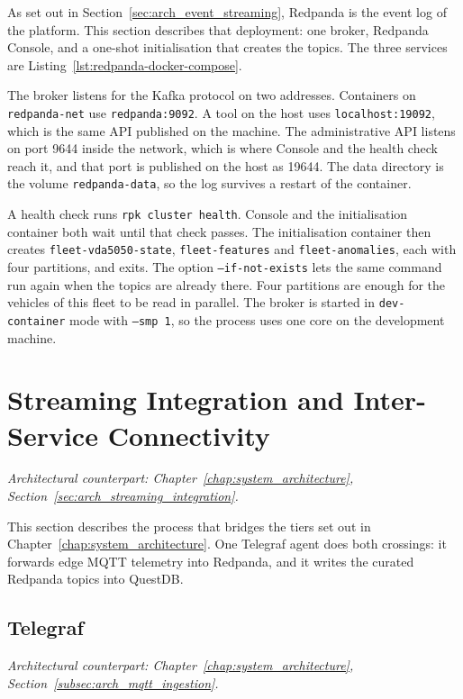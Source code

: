 As set out in Section~\ref{sec:arch_event_streaming}, Redpanda is the event log of the platform. This section describes that deployment: one broker, Redpanda Console, and a one-shot initialisation that creates the topics. The three services are Listing~\ref{lst:redpanda-docker-compose}.

The broker listens for the Kafka protocol on two addresses. Containers on \texttt{redpanda-net} use \texttt{redpanda:9092}. A tool on the host uses \texttt{localhost:19092}, which is the same API published on the machine. The administrative API listens on port 9644 inside the network, which is where Console and the health check reach it, and that port is published on the host as 19644. The data directory is the volume \texttt{redpanda-data}, so the log survives a restart of the container.

A health check runs \texttt{rpk cluster health}. Console and the initialisation container both wait until that check passes. The initialisation container then creates \texttt{fleet-vda5050-state}, \texttt{fleet-features} and \texttt{fleet-anomalies}, each with four partitions, and exits. The option \texttt{--if-not-exists} lets the same command run again when the topics are already there. Four partitions are enough for the vehicles of this fleet to be read in parallel. The broker is started in \texttt{dev-container} mode with \texttt{--smp 1}, so the process uses one core on the development machine.


\section{Streaming Integration and Inter-Service Connectivity}
\label{sec:stream_integration_implementation}
\textit{Architectural counterpart: Chapter~\ref{chap:system_architecture}, Section~\ref{sec:arch_streaming_integration}.}

This section describes the process that bridges the tiers set out in Chapter~\ref{chap:system_architecture}. One Telegraf agent does both crossings: it forwards edge MQTT telemetry into Redpanda, and it writes the curated Redpanda topics into QuestDB.

\subsection{Telegraf}
\label{subsec:telegraf_integration}
\textit{Architectural counterpart: Chapter~\ref{chap:system_architecture}, Section~\ref{subsec:arch_mqtt_ingestion}.}

